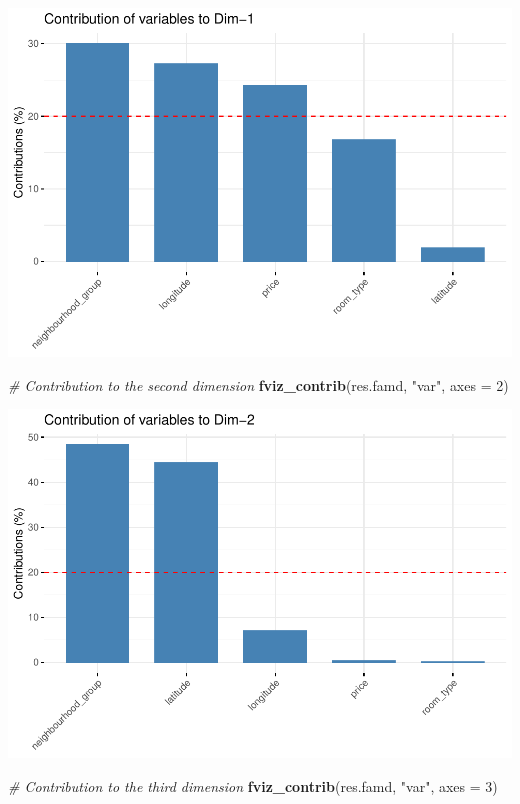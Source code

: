 \documentclass[
]{article}
\newenvironment{Shaded}{\begin{snugshade}}{\end{snugshade}}
\newcommand{\CommentTok}[1]{\textcolor[rgb]{0.56,0.35,0.01}{\textit{#1}}}
\newcommand{\DataTypeTok}[1]{\textcolor[rgb]{0.13,0.29,0.53}{#1}}
\newcommand{\DecValTok}[1]{\textcolor[rgb]{0.00,0.00,0.81}{#1}}
\newcommand{\KeywordTok}[1]{\textcolor[rgb]{0.13,0.29,0.53}{\textbf{#1}}}
\newcommand{\NormalTok}[1]{#1}
\newcommand{\StringTok}[1]{\textcolor[rgb]{0.31,0.60,0.02}{#1}}
\begin{document}
\includegraphics{project-code_files/figure-latex/unnamed-chunk-37-2.pdf}

\begin{Shaded}
\begin{Highlighting}[]
\CommentTok{# Contribution to the second dimension}
\KeywordTok{fviz_contrib}\NormalTok{(res.famd, }\StringTok{"var"}\NormalTok{, }\DataTypeTok{axes =} \DecValTok{2}\NormalTok{)}
\end{Highlighting}
\end{Shaded}

\includegraphics{project-code_files/figure-latex/unnamed-chunk-37-3.pdf}

\begin{Shaded}
\begin{Highlighting}[]
\CommentTok{# Contribution to the third dimension}
\KeywordTok{fviz_contrib}\NormalTok{(res.famd, }\StringTok{"var"}\NormalTok{, }\DataTypeTok{axes =} \DecValTok{3}\NormalTok{)}
\end{Highlighting}
\end{Shaded}
\end{document}
